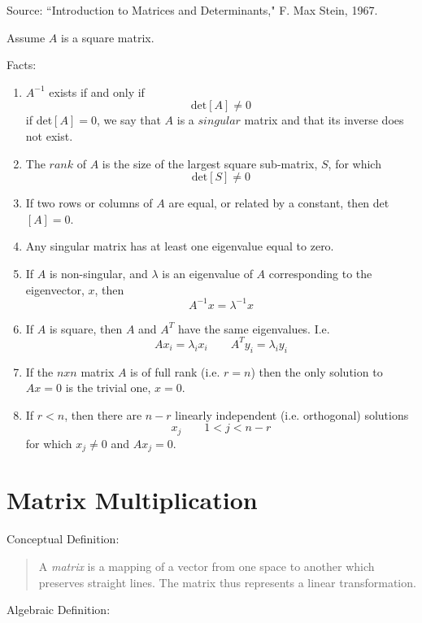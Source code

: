 Source: ``Introduction to Matrices and Determinants," F. Max Stein, 1967.

Assume $A$ is a square matrix.

Facts:

\begin{enumerate}
\item $A^{-1}$ exists if and only if
\[
\mathrm{det}[A] \ne 0
\]
if det$[A] = 0$, we say that $A$ is a $singular$ matrix and that its inverse does not exist.

\item The $rank$ of $A$ is the size of the largest square sub-matrix, $S$, for which
\[
\mathrm{det}[S] \ne 0
\]

\item If two rows or columns of $A$ are equal, or related by a constant, then det$[A]=0$.

\item Any singular matrix has at least one eigenvalue equal to zero.

\item If $A$ is non-singular, and $\lambda$ is an eigenvalue of $A$ corresponding to the eigenvector, $x$, then
\[
A^{-1}x = \lambda^{-1}x
\]

\item If $A$ is square, then $A$ and $A^T$ have the same eigenvalues.  I.e.
\[
Ax_i = \lambda_i x_i \qquad A^Ty_i = \lambda_i y_i
\]

\item If the $nxn$ matrix $A$ is of full rank (i.e. $r=n$) then the only solution to $Ax=0$ is the trivial one, $x=0$.

\item If $r<n$, then there are $n-r$ linearly independent (i.e. orthogonal) solutions
\[
x_j \qquad 1 < j < n-r
\]
for which $x_j\ne0$ and $Ax_j = 0$.

\end{enumerate}

\newpage
\section{Matrix Multiplication}
Conceptual Definition:
\begin{quotation}
A {\it matrix} is a mapping of a vector from one space to another which preserves straight lines.  The matrix thus represents a linear transformation.
\end{quotation}

Algebraic Definition:

